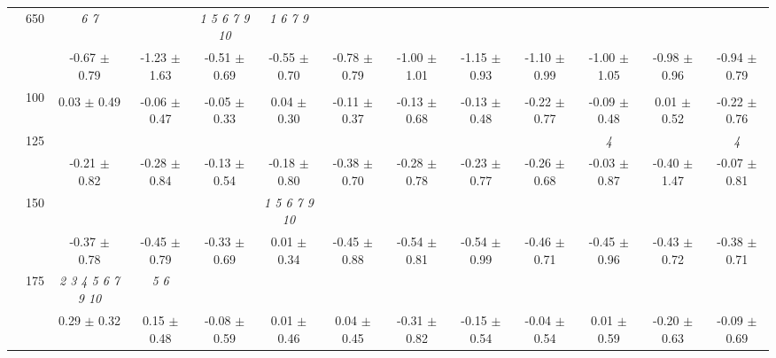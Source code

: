\begin{table}[h]
{\begin{tabular}{
        ccccccccccccc}
 & \multirow{2}{*}{650}& \textit{ 6 7 }& & \textit{  1  5  6  7  9 10 }& \textit{ 1 6 7 9 }& & & & & & &  \\ 
 & & -0.67 $\pm$ 0.79& -1.23 $\pm$ 1.63& -0.51 $\pm$ 0.69& -0.55 $\pm$ 0.70& -0.78 $\pm$ 0.79& -1.00 $\pm$ 1.01& -1.15 $\pm$ 0.93& -1.10 $\pm$ 0.99& -1.00 $\pm$ 1.05& -0.98 $\pm$ 0.96& -0.94 $\pm$ 0.79 \\ \midrule 
 & \multirow{2}{*}{100}& & & & & & & & & & &  \\ 
 & & 0.03 $\pm$ 0.49& -0.06 $\pm$ 0.47& -0.05 $\pm$ 0.33& 0.04 $\pm$ 0.30& -0.11 $\pm$ 0.37& -0.13 $\pm$ 0.68& -0.13 $\pm$ 0.48& -0.22 $\pm$ 0.77& -0.09 $\pm$ 0.48& 0.01 $\pm$ 0.52& -0.22 $\pm$ 0.76 \\ 
 & \multirow{2}{*}{125}& \cellcolor[HTML]{EFEFEF} & \cellcolor[HTML]{EFEFEF} & \cellcolor[HTML]{EFEFEF} & \cellcolor[HTML]{EFEFEF} & \cellcolor[HTML]{EFEFEF} & \cellcolor[HTML]{EFEFEF} & \cellcolor[HTML]{EFEFEF} & \cellcolor[HTML]{EFEFEF} & \cellcolor[HTML]{EFEFEF} \textit{ 4 }& \cellcolor[HTML]{EFEFEF} & \cellcolor[HTML]{EFEFEF} \textit{ 4 } \\ 
 & & \cellcolor[HTML]{EFEFEF} -0.21 $\pm$ 0.82& \cellcolor[HTML]{EFEFEF} -0.28 $\pm$ 0.84& \cellcolor[HTML]{EFEFEF} -0.13 $\pm$ 0.54& \cellcolor[HTML]{EFEFEF} -0.18 $\pm$ 0.80& \cellcolor[HTML]{EFEFEF} -0.38 $\pm$ 0.70& \cellcolor[HTML]{EFEFEF} -0.28 $\pm$ 0.78& \cellcolor[HTML]{EFEFEF} -0.23 $\pm$ 0.77& \cellcolor[HTML]{EFEFEF} -0.26 $\pm$ 0.68& \cellcolor[HTML]{EFEFEF} -0.03 $\pm$ 0.87& \cellcolor[HTML]{EFEFEF} -0.40 $\pm$ 1.47& \cellcolor[HTML]{EFEFEF} -0.07 $\pm$ 0.81 \\ 
 & \multirow{2}{*}{150}& & & & \textit{  1  5  6  7  9 10 }& & & & & & &  \\ 
 & & -0.37 $\pm$ 0.78& -0.45 $\pm$ 0.79& -0.33 $\pm$ 0.69& 0.01 $\pm$ 0.34& -0.45 $\pm$ 0.88& -0.54 $\pm$ 0.81& -0.54 $\pm$ 0.99& -0.46 $\pm$ 0.71& -0.45 $\pm$ 0.96& -0.43 $\pm$ 0.72& -0.38 $\pm$ 0.71 \\ 
 & \multirow{2}{*}{175}& \cellcolor[HTML]{EFEFEF} \textit{  2  3  4  5  6  7  9 10 }& \cellcolor[HTML]{EFEFEF} \textit{ 5 6 }& \cellcolor[HTML]{EFEFEF} & \cellcolor[HTML]{EFEFEF} & \cellcolor[HTML]{EFEFEF} & \cellcolor[HTML]{EFEFEF} & \cellcolor[HTML]{EFEFEF} & \cellcolor[HTML]{EFEFEF} & \cellcolor[HTML]{EFEFEF} & \cellcolor[HTML]{EFEFEF} & \cellcolor[HTML]{EFEFEF}  \\ 
 & & \cellcolor[HTML]{EFEFEF} 0.29 $\pm$ 0.32& \cellcolor[HTML]{EFEFEF} 0.15 $\pm$ 0.48& \cellcolor[HTML]{EFEFEF} -0.08 $\pm$ 0.59& \cellcolor[HTML]{EFEFEF} 0.01 $\pm$ 0.46& \cellcolor[HTML]{EFEFEF} 0.04 $\pm$ 0.45& \cellcolor[HTML]{EFEFEF} -0.31 $\pm$ 0.82& \cellcolor[HTML]{EFEFEF} -0.15 $\pm$ 0.54& \cellcolor[HTML]{EFEFEF} -0.04 $\pm$ 0.54& \cellcolor[HTML]{EFEFEF} 0.01 $\pm$ 0.59& \cellcolor[HTML]{EFEFEF} -0.20 $\pm$ 0.63& \cellcolor[HTML]{EFEFEF} -0.09 $\pm$ 0.69 \\ 

\end{tabular}}
\end{table}
